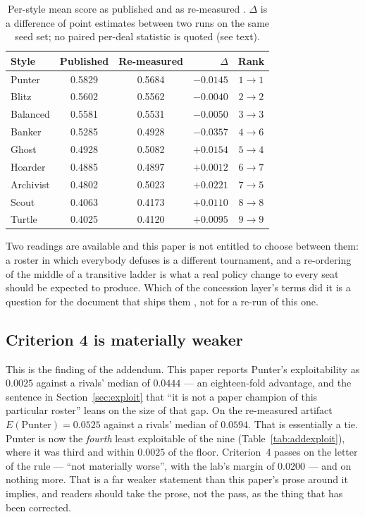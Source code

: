 \documentclass[11pt]{article}
\begin{document}
\begin{table}[t]
\centering
\caption{Per-style mean score as published and as re-measured \cite{artifact,artifactv2b}.
$\Delta$ is a difference of point estimates between two runs on the same seed set; no paired
per-deal statistic is quoted (see text).}
\label{tab:addrank}
\footnotesize
\begin{tabular}{@{}lccrc@{}}
\toprule
Style & Published & Re-measured & $\Delta$ & Rank \\
\midrule
Punter    & 0.5829 & 0.5684 & $-0.0145$ & $1 \to 1$ \\
Blitz     & 0.5602 & 0.5562 & $-0.0040$ & $2 \to 2$ \\
Balanced  & 0.5581 & 0.5531 & $-0.0050$ & $3 \to 3$ \\
Banker    & 0.5285 & 0.4928 & $-0.0357$ & $4 \to 6$ \\
Ghost     & 0.4928 & 0.5082 & $+0.0154$ & $5 \to 4$ \\
Hoarder   & 0.4885 & 0.4897 & $+0.0012$ & $6 \to 7$ \\
Archivist & 0.4802 & 0.5023 & $+0.0221$ & $7 \to 5$ \\
Scout     & 0.4063 & 0.4173 & $+0.0110$ & $8 \to 8$ \\
Turtle    & 0.4025 & 0.4120 & $+0.0095$ & $9 \to 9$ \\
\bottomrule
\end{tabular}
\end{table}

Two readings are available and this paper is not entitled to choose between them: a roster in
which everybody defuses is a different tournament, and a re-ordering of the middle of a
transitive ladder is what a real policy change to every seat should be expected to produce.
Which of the concession layer's terms did it is a question for the document that ships them
\cite{concession}, not for a re-run of this one.

\subsection{Criterion 4 is materially weaker}
\label{sec:addcrit4}

This is the finding of the addendum. This paper reports Punter's exploitability as $0.0025$
against a rivals' median of $0.0444$ --- an eighteen-fold advantage, and the sentence in
Section~\ref{sec:exploit} that ``it is not a paper champion of this particular roster'' leans
on the size of that gap. On the re-measured artifact $E(\text{Punter}) = 0.0525$ against a
rivals' median of $0.0594$. That is essentially a tie. Punter is now the \emph{fourth} least
exploitable of the nine (Table~\ref{tab:addexploit}), where it was third and within $0.0025$ of
the floor. Criterion~4 passes on the letter of the rule --- ``not materially worse'', with the
lab's margin of $0.0200$ --- and on nothing more. That is a far weaker statement than this
paper's prose around it implies, and readers should take the prose, not the pass, as the thing
that has been corrected.
\end{document}
